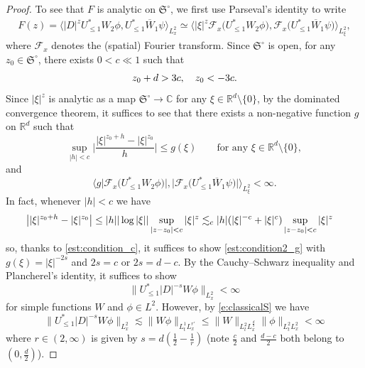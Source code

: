 \documentclass[a4paper]{amsart}
\numberwithin{equation}{section}%
\theoremstyle{plain}%
\theoremstyle{definition}
\theoremstyle{remark}%
\def\Re{\mathfrak{R}}
\newcommand{\R}{{\mathbb R}}
\newcommand{\Co}{{\mathbb C}}
\newcommand{\F}{\mathcal{F}}
\let\Re\relax
\DeclareMathOperator{\Re}{Re}
\begin{document}
\begin{proof}
To see that $F$ 
is analytic on $\mathfrak{S}^{\circ}$, we first use Parseval's identity to write
\begin{align*}
F(z)
= \langle  |D|^z U_{\leq 1}^* W_2 \phi, U_{\leq 1}^* \overline{W}_1 \psi \rangle_{L_{x}^2}  \simeq \bigl\langle |\xi|^z \F_{x}\bigl(U_{\leq 1}^* W_2 \phi\bigr), 
\F_{x}\bigl(U_{\leq 1}^* \overline{W}_1 \psi \bigr) \bigr\rangle_{L_{\xi}^2},
\end{align*}
where $\F_{x}$ denotes the (spatial) Fourier transform.
Since $\mathfrak{S}^{\circ}$ is open, for any $z_0 \in \mathfrak{S}^{\circ}$, there exists $0<c \ll 1$ such that
\begin{equation}\label{est:condition_c}
\Re z_0 + d > 3 c, \quad \Re z_0 < - 3c.
\end{equation}
Since $|\xi|^z$ is analytic as a map $\mathfrak{S}^{\circ} \to \Co$ for any $\xi \in \R^d \setminus \{0\}$, by the dominated convergence theorem, it suffices to see that there exists a non-negative function $g$ on $\R^d$ such that
\begin{equation*}\label{est:condition1_g}
\sup_{|h| < c} \bigg| \frac{|\xi|^{z_0+h} - |\xi|^{z_0}}{h} \bigg| \leq g(\xi) \qquad \text{for any $\xi \in \R^d\setminus \{0\}$},
\end{equation*}
and 
\begin{equation}\label{est:condition2_g}
\bigl\langle g \bigl|\F_{x}\bigl(U_{\leq 1}^* W_2 \phi\bigr)\bigr|, 
\bigl|\F_{x}\bigl(U_{\leq 1}^* \overline{W}_1 \psi \bigr) \bigr| \bigr\rangle_{L_{\xi}^2} < \infty.
\end{equation}
In fact, whenever $|h| < c$ we have
\begin{align*}
 \bigl| |\xi|^{z_0 + h} - |\xi|^{z_0} \bigr| 
& \leq |h| |\log |\xi|| \sup_{|z - z_0| < c} |\xi|^{\Re z} \lesssim_c |h| (|\xi|^{-c} + |\xi|^c) \sup_{|z - z_0| < c} |\xi|^{\Re z}
\end{align*}
so, thanks to \eqref{est:condition_c}, it suffices to show \eqref{est:condition2_g} with $g(\xi) = |\xi|^{-2s}$ and $2s = c$ or $2s = d-c$. By the Cauchy--Schwarz inequality and Plancherel's identity, it suffices to show
\[
\| U_{\leq 1}^* |D|^{-s}  W \phi\|_{L_{x}^2} < \infty
\]
for simple functions $W$ and $\phi \in L^2$. However, by \eqref{e:classicalS} we have
\[
\| U_{\leq 1}^* |D|^{-s}  W \phi\|_{L_{x}^2} \lesssim \|W \phi\|_{L_t^1 L_x^{r'}} \leq \|W\|_{L_t^2 L_x^{\frac{d}{s}}} \| \phi\|_{L^2_tL^2_x} < \infty
\]
where $r \in (2,\infty)$ is given by $s = d(\frac{1}{2} - \frac{1}{r})$ (note $\frac{c}{2}$ and $\frac{d-c}{2}$ both belong to $(0,\frac{d}{2})$).
\end{proof}
\end{document}
